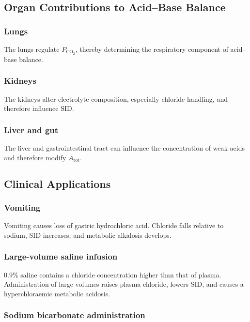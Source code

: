 \documentclass[11pt,a4paper]{article}
\begin{document}
\subsection{Organ Contributions to Acid--Base Balance}

\subsubsection{Lungs}

The lungs regulate \(P_{\mathrm{CO_2}}\), thereby determining the respiratory component of acid--base balance.

\subsubsection{Kidneys}

The kidneys alter electrolyte composition, especially chloride handling, and therefore influence SID.

\subsubsection{Liver and gut}

The liver and gastrointestinal tract can influence the concentration of weak acids and therefore modify \(A_{\mathrm{tot}}\).

\subsection{Clinical Applications}

\subsubsection{Vomiting}

Vomiting causes loss of gastric hydrochloric acid. Chloride falls relative to sodium, SID increases, and metabolic alkalosis develops.

\subsubsection{Large-volume saline infusion}

\(0.9\%\) saline contains a chloride concentration higher than that of plasma. Administration of large volumes raises plasma chloride, lowers SID, and causes a hyperchloraemic metabolic acidosis.

\subsubsection{Sodium bicarbonate administration}
\end{document}
